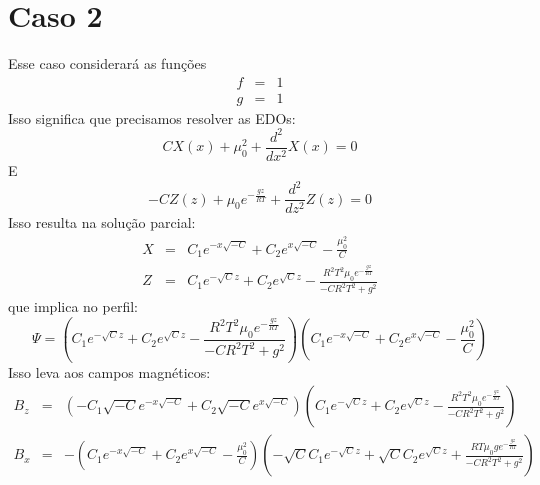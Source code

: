\documentclass[12pt]{article}
\def\be{\begin{equation}}
\def\ee{\end{equation}}
\def\bea{\begin{eqnarray*}}
\def\eea{\end{eqnarray*}}
\theoremstyle{definition}
\numberwithin{equation}{section}
\begin{document}
        \section{Caso 2}
        Esse caso considerará as funções
        \bea
            f &=& 1 \\
            g &=& 1
        \eea
        Isso significa que precisamos resolver as EDOs:
        \be
            C X{\left(x \right)} + \mu_{0}^{2} + \frac{d^{2}}{d x^{2}} X{\left(x \right)} = 0
        \ee
        E
        \be
            - C Z{\left(z \right)} + \mu_{0} e^{- \frac{g z}{R T}} + \frac{d^{2}}{d z^{2}} Z{\left(z \right)} = 0
        \ee
        Isso resulta na solução parcial:
        \bea
            X &=& C_{1} e^{- x \sqrt{- C}} + C_{2} e^{x \sqrt{- C}} - \frac{\mu_{0}^{2}}{C} \\
            Z &=& C_{1} e^{- \sqrt{C} z} + C_{2} e^{\sqrt{C} z} - \frac{R^{2} T^{2} \mu_{0} e^{- \frac{g z}{R T}}}{- C R^{2} T^{2} + g^{2}}
        \eea
        que implica no perfil:
        \be
            \Psi = \left(C_{1} e^{- \sqrt{C} z} + C_{2} e^{\sqrt{C} z} - \frac{R^{2} T^{2} \mu_{0} e^{- \frac{g z}{R T}}}{- C R^{2} T^{2} + g^{2}}\right) \left(C_{1} e^{- x \sqrt{- C}} + C_{2} e^{x \sqrt{- C}} - \frac{\mu_{0}^{2}}{C}\right)
        \ee
        Isso leva aos campos magnéticos:
        \bea
            B_z &=& \left(- C_{1} \sqrt{- C} e^{- x \sqrt{- C}} + C_{2} \sqrt{- C} e^{x \sqrt{- C}}\right) \left(C_{1} e^{- \sqrt{C} z} + C_{2} e^{\sqrt{C} z} - \frac{R^{2} T^{2} \mu_{0} e^{- \frac{g z}{R T}}}{- C R^{2} T^{2} + g^{2}}\right)\\
            B_x &=& - \left(C_{1} e^{- x \sqrt{- C}} + C_{2} e^{x \sqrt{- C}} - \frac{\mu_{0}^{2}}{C}\right) \left(- \sqrt{C} C_{1} e^{- \sqrt{C} z} + \sqrt{C} C_{2} e^{\sqrt{C} z} + \frac{R T \mu_{0} g e^{- \frac{g z}{R T}}}{- C R^{2} T^{2} + g^{2}}\right)
        \eea
        
\end{document}
